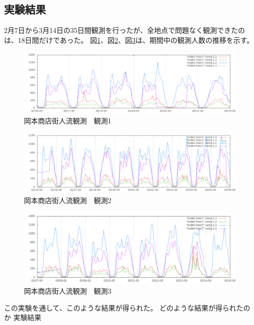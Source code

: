 \subsection{実験結果}
2月7日から3月14日の35日間観測を行ったが、全地点で問題なく観測できたのは、18日間だけであった。
図\ref{fig:okamoto_dat1}、図\ref{fig:okamoto_dat2}、図\ref{fig:okamoto_dat3}は、期間中の観測人数の推移を示す。
\begin{figure}[htbp]
\includegraphics[width=16cm]{images/okamoto_dat1.png}
\caption{岡本商店街人流観測　観測1}
\label{fig:okamoto_dat1}
\end{figure}
\begin{figure}[htbp]
\includegraphics[width=16cm]{images/okamoto_dat2.png}
\caption{岡本商店街人流観測　観測2}
\label{fig:okamoto_dat2}
\end{figure}
\begin{figure}[htbp]
\includegraphics[width=16cm]{images/okamoto_dat3.png}
\caption{岡本商店街人流観測　観測3}
\label{fig:okamoto_dat3}
\end{figure}

この実験を通して、このような結果が得られた。
どのような結果が得られたのか
実験結果

